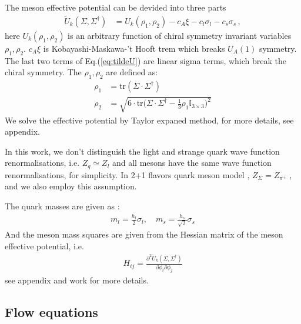 \documentclass[%
reprint,
superscriptaddress,
showpacs,preprintnumbers,
amsmath,amssymb,
aps,
prd,
]{revtex4-1}
\begin{document}
The meson effective potential can be devided into three parts
\begin{align}
  \tilde{U}_{k}(\Sigma,\Sigma^\dagger)&=U_k(\rho_1,\rho_2)-c_A \xi-c_l\sigma_l-c_s\sigma_s\,, \label{eq:tildeU}
\end{align}
here $U_k(\rho_1,\rho_2)$ is an arbitrary function of chiral symmetry invariant variables $\rho_1,\rho_2$.  $ c_A \xi$ is Kobayashi-Maskawa-’t Hooft trem which breaks $U_A(1)$ symmetry. The last two terms of Eq.(\ref{eq:tildeU}) are linear sigma terms, which break the chiral symmetry. The $\rho_1,\rho_2$ are defined as:
\begin{align}
\rho_1&=\text{tr}(\Sigma \cdot \Sigma ^\dagger) \\
\rho_2&=\sqrt{6 \cdot \text{tr}\bigg (\Sigma \cdot \Sigma ^\dagger-\frac{1}{3} \rho_1 \mathbb{I}_{3 \times 3} \bigg )^2 }
\end{align}
We solve the effective potential  by Taylor expaned method, for more details, see appendix.

In this work, we don't distinguish the light and strange quark wave function renormalisations, i.e. $Z_q\simeq Z_l$ and all mesons have the same wave function renormalisations,  for simplicity. In 
2+1 flavors quark meson model \cite{Rennecke:2016tkm} , $Z_\Sigma=Z_{\pi^+}$ , and we also employ this assumption.

The quark masses are given as :
 \begin{align}\label{quarkmass_eq}
m_l=\frac{h_{l}}{2}\sigma_l , \quad m_s=\frac{h_{s}}{\sqrt{2}}\sigma_s
\end{align}
And the meson mass squares are given from the Hessian matrix of the meson effective potential, i.e.
 \begin{align}
H_{ij}=\frac{ \partial^2 \tilde{U}_{k}(\Sigma,\Sigma^\dagger)}{\partial \phi_i \partial \phi_j}
 \end{align}
see appendix and work \cite{Rennecke:2016tkm,Wen:2018nkn} for more details.


\subsection{Flow equations}\label{sec:Floweq}
\end{document}
